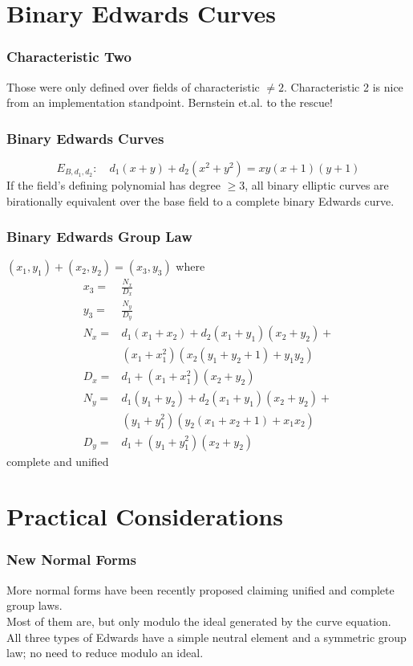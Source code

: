 \documentclass[xcolor=dvipsnames, handout]{beamer}
\begin{document}
\section{Binary Edwards Curves}

\begin{frame}
    \frametitle{Characteristic Two}
    Those were only defined over fields of characteristic $\ne 2$.
    Characteristic 2 is nice from an implementation standpoint.
    Bernstein et.al. to the rescue!
\end{frame}

\begin{frame}
    \frametitle{Binary Edwards Curves}
    \begin{displaymath}
        E_{B, d_1, d_2}: \quad d_1(x + y) + d_2(x^2 + y^2) = xy(x + 1)(y + 1)
    \end{displaymath}
    If the field's defining polynomial has degree $\ge 3$, all binary elliptic
        curves are birationally equivalent \alert{over the base field} to a
        complete binary Edwards curve.
\end{frame}

\begin{frame}
    \frametitle{Binary Edwards Group Law}
    $(x_1, y_1) + (x_2, y_2) = (x_3, y_3)$ where
    \begin{align*}
        x_3 =  &\frac{N_x}{D_x}\\
        y_3 =  &\frac{N_y}{D_y}\\
        N_x =  &d_1(x_1 + x_2) + d_2(x_1 + y_1)(x_2 + y_2) +\\
               &(x_1 + x_1^2)(x_2(y_1 + y_2 + 1) + y_1y_2)\\
        D_x =  &d_1 + (x_1 + x_1^2)(x_2 + y_2)\\
        N_y =  &d_1(y_1 + y_2) + d_2(x_1 + y_1)(x_2 + y_2) +\\
               &(y_1 + y_1^2)(y_2(x_1 + x_2 + 1) + x_1x_2)\\
        D_y =  &d_1 + (y_1 + y_1^2)(x_2 + y_2)
    \end{align*}
    \pause
    \alert{complete and unified}
\end{frame}

\section{Practical Considerations}

\begin{frame}
    \frametitle{New Normal Forms}
    More normal forms have been recently proposed claiming unified and complete
    group laws.\\
    \pause
    Most of them are, but only modulo the ideal generated by the curve
        equation.\\
    \pause
    All three types of Edwards have a simple neutral element and a symmetric
        group law; no need to reduce modulo an ideal.
\end{frame}
\end{document}
